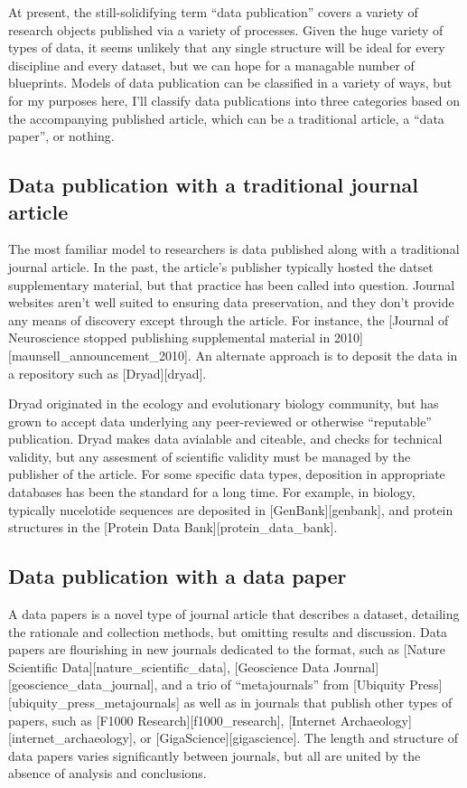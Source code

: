 \documentclass[10pt,a4paper,twocolumn]{article}
\begin{document}
At present, the still-solidifying term ``data publication'' covers a variety of research objects published via a variety of processes.
Given the huge variety of types of data, it seems unlikely that any single structure will be ideal for every discipline and every dataset, but we can hope for a managable number of blueprints. 
Models of data publication can be classified in a variety of ways, but for my purposes here, I'll classify data publications into three categories based on the accompanying published article, which can be a traditional article, a ``data paper'', or nothing.

\subsection*{Data publication with a traditional journal article}\label{data-publication-with-a-traditional-journal-article}

The most familiar model to researchers is data published along with a traditional journal article. 
In the past, the article's publisher typically hosted the datset supplementary material, but that practice has been called into question. 
Journal websites aren't well suited to ensuring data preservation, and they don't provide any means of discovery except through the article. For instance, the {[}Journal of Neuroscience stopped publishing supplemental material in 2010{]}{[}maunsell\_announcement\_2010{]}. 
An alternate approach is to deposit the data in a repository such as {[}Dryad{]}{[}dryad{]}.

Dryad originated in the ecology and evolutionary biology community, but has grown to accept data underlying any peer-reviewed or otherwise ``reputable'' publication. Dryad makes data avialable and citeable, and checks for technical validity, but any assesment of scientific validity must be managed by the publisher of the article. For some specific data types, deposition in appropriate databases has been the standard for a long time. 
For example, in biology, typically nucelotide sequences are deposited in {[}GenBank{]}{[}genbank{]}, and protein structures in the {[}Protein Data Bank{]}{[}protein\_data\_bank{]}.

\subsection*{Data publication with a data paper}\label{data-publication-with-a-data-paper}

A data papers is a novel type of journal article that describes a dataset, detailing the rationale and collection methods, but omitting results and discussion. Data papers are flourishing in new journals dedicated to the format, such as {[}Nature Scientific Data{]}{[}nature\_scientific\_data{]}, {[}Geoscience Data Journal{]}{[}geoscience\_data\_journal{]}, and a trio of ``metajournals'' from {[}Ubiquity Press{]}{[}ubiquity\_press\_metajournals{]} as well as in journals that publish other types of papers, such as {[}F1000 Research{]}{[}f1000\_research{]}, {[}Internet Archaeology{]}{[}internet\_archaeology{]}, or {[}GigaScience{]}{[}gigascience{]}. 
The length and structure of data papers varies significantly between journals, but all are united by the absence of analysis and conclusions.
\end{document}
